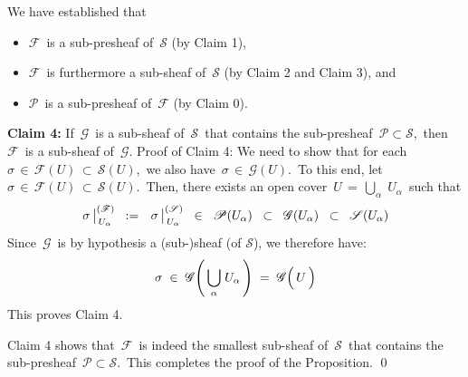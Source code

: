 \vskip 0.5cm
\noindent
We have established that
\begin{itemize}
\item
	$\mathscr{F}$\, is a sub-presheaf of \,$\mathscr{S}$ (by Claim 1),
\item
	$\mathscr{F}$\, is furthermore a sub-sheaf of \,$\mathscr{S}$ (by Claim 2 and Claim 3), and
\item
	$\mathscr{P}$\, is a sub-presheaf of \,$\mathscr{F}$ (by Claim 0).
\end{itemize}

\vskip 0.5cm
\noindent
\textbf{Claim 4:}\;\;
If \,$\mathscr{G}$\, is a sub-sheaf of \,$\mathscr{S}$\, that contains the sub-presheaf \,$\mathscr{P} \subset \mathscr{S}$,\,
then \,$\mathscr{F}$\, is a sub-sheaf of \,$\mathscr{G}$.
\vskip 0.2cm
\noindent
Proof of Claim 4:\;\;
We need to show that for each
\,$\sigma \,\in\, \mathscr{F}(U) \,\subset\, \mathscr{S}(U)$,\,
we also have 
\,$\sigma \,\in\, \mathscr{G}(U)$.\,
To this end, let 
\,$\sigma \,\in\, \mathscr{F}(U) \,\subset\, \mathscr{S}(U)$.\,
Then, there exists an open cover
\,$U \,=\, \underset{\alpha}{\bigcup}\;U_{\alpha}$\,
such that
\begin{equation*}
\left.\overset{{\color{white}.}}{\sigma}\,\right\vert^{(\mathscr{F})}_{\,U_{\alpha}}
\;\; := \;\;
	\left.\overset{{\color{white}.}}{\sigma}\,\right\vert^{(\mathscr{S})}_{\,U_{\alpha}}
\;\;\in\;\;
	\mathscr{P}(U_{\alpha})
\;\;\subset\;\;
\mathscr{G}(U_{\alpha})
\;\;\subset\;\;
	\mathscr{S}(U_{\alpha})
\end{equation*}
Since \,$\mathscr{G}$\, is by hypothesis a (sub-)sheaf (of $\mathscr{S}$), we therefore have:
\begin{equation*}
\sigma
\;\in\; \mathscr{G}\!\left(\,\underset{\alpha}{\bigcup}\;U_{\alpha}\,\right)
\; = \; \mathscr{G}\!\left(\,\overset{{\color{white}.}}{U}\,\right)
\end{equation*}
This proves Claim 4.

\vskip 0.5cm
\noindent
Claim 4 shows that \,$\mathscr{F}$\, is indeed the smallest sub-sheaf of \,$\mathscr{S}$\,
that contains the sub-presheaf \,$\mathscr{P} \subset \mathscr{S}$.\,
This completes the proof of the Proposition.
\qed


